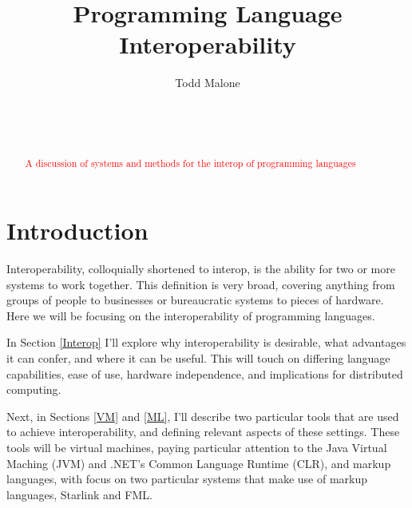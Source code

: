 \documentclass{sig-alternate}
\newcommand{\mycomment}[1]{\textcolor{red}{#1}}
\begin{document}

\title{Programming Language Interoperability}


\author{
\alignauthor
Todd Malone\\
	\\
	\\
	\\
}

\maketitle
\begin{abstract}
\mycomment{A discussion of systems and methods for the interop of programming languages}
\end{abstract}


\section{Introduction}
Interoperability, colloquially shortened to interop, is the ability for two or more systems to work together. This definition is very broad, covering anything from groups of people to businesses or bureaucratic systems to pieces of hardware. Here we will be focusing on the interoperability of programming languages.

In Section \ref{Interop} I'll explore why interoperability is desirable, what advantages it can confer, and where it can be useful. This will touch on differing language capabilities, ease of use, hardware independence, and implications for distributed computing.

Next, in Sections \ref{VM} and \ref{ML}, I'll describe two particular tools that are used to achieve interoperability, and defining relevant aspects of these settings. These tools will be virtual machines, paying particular attention to the Java Virtual Maching (JVM) and .NET's Common Language Runtime (CLR), and markup languages, with focus on two particular systems that make use of markup languages, Starlink and FML.
\end{document}
